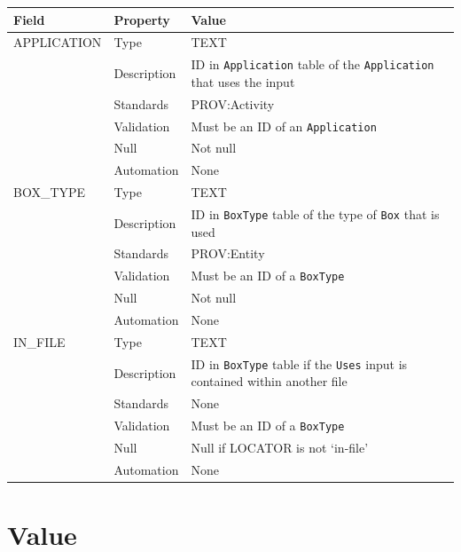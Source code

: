 \documentclass[
]{article}
\newcounter{none}
\begin{document}
{\def\LTcaptype{none} 
\begin{longtable}[]{@{}
  >{\raggedright\arraybackslash}p{}
  >{\raggedright\arraybackslash}p{}
  >{\raggedright\arraybackslash}p{}@{}}
\toprule\noalign{}
\begin{minipage}[b]{\linewidth}\raggedright
Field
\end{minipage} & \begin{minipage}[b]{\linewidth}\raggedright
Property
\end{minipage} & \begin{minipage}[b]{\linewidth}\raggedright
Value
\end{minipage} \\
\midrule\noalign{}
\endhead
\bottomrule\noalign{}
\endlastfoot
APPLICATION & Type & TEXT \\
& Description & ID in \texttt{Application} table of the
\texttt{Application} that uses the input \\
& Standards & PROV:Activity \\
& Validation & Must be an ID of an \texttt{Application} \\
& Null & Not null \\
& Automation & None \\
BOX\_TYPE & Type & TEXT \\
& Description & ID in \texttt{BoxType} table of the type of \texttt{Box}
that is used \\
& Standards & PROV:Entity \\
& Validation & Must be an ID of a \texttt{BoxType} \\
& Null & Not null \\
& Automation & None \\
IN\_FILE & Type & TEXT \\
& Description & ID in \texttt{BoxType} table if the \texttt{Uses} input
is contained within another file \\
& Standards & None \\
& Validation & Must be an ID of a \texttt{BoxType} \\
& Null & Null if LOCATOR is not `in-file' \\
& Automation & None \\
\end{longtable}
}

\section{Value}\label{value}
\end{document}
